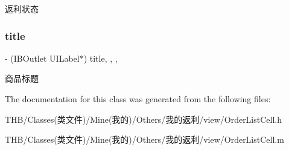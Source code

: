 返利状态 \mbox{\label{interface_order_list_cell_a71cc21ed2ecbf39ca27669c27b3c3277}} 
\subsubsection{\texorpdfstring{title}{title}}
{\footnotesize\ttfamily -\/ (I\+B\+Outlet U\+I\+Label$\ast$) title\hspace{0.3cm}{\ttfamily [read]}, {\ttfamily [write]}, {\ttfamily [nonatomic]}, {\ttfamily [weak]}}

商品标题 

The documentation for this class was generated from the following files\+:\begin{DoxyCompactItemize}
\item 
T\+H\+B/\+Classes(类文件)/\+Mine(我的)/\+Others/我的返利/view/Order\+List\+Cell.\+h\item 
T\+H\+B/\+Classes(类文件)/\+Mine(我的)/\+Others/我的返利/view/Order\+List\+Cell.\+m\end{DoxyCompactItemize}
